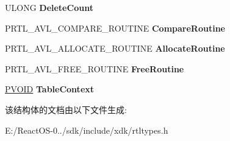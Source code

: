 \begin{DoxyCompactItemize}
U\+L\+O\+NG {\bfseries Delete\+Count}
\item 
\mbox{\label{struct___r_t_l___a_v_l___t_a_b_l_e_a6861733c4b10478e5ad30c568e4ab5cd}} 
P\+R\+T\+L\+\_\+\+A\+V\+L\+\_\+\+C\+O\+M\+P\+A\+R\+E\+\_\+\+R\+O\+U\+T\+I\+NE {\bfseries Compare\+Routine}
\item 
\mbox{\label{struct___r_t_l___a_v_l___t_a_b_l_e_a2acd7c68be0790cc70b62327ec9a2eac}} 
P\+R\+T\+L\+\_\+\+A\+V\+L\+\_\+\+A\+L\+L\+O\+C\+A\+T\+E\+\_\+\+R\+O\+U\+T\+I\+NE {\bfseries Allocate\+Routine}
\item 
\mbox{\label{struct___r_t_l___a_v_l___t_a_b_l_e_a9a3e1e9a6b17a363841ad2cc8859f6bd}} 
P\+R\+T\+L\+\_\+\+A\+V\+L\+\_\+\+F\+R\+E\+E\+\_\+\+R\+O\+U\+T\+I\+NE {\bfseries Free\+Routine}
\item 
\mbox{\label{struct___r_t_l___a_v_l___t_a_b_l_e_ab7eff19c435888386ee1141cc1c76c41}} 
\hyperlink{interfacevoid}{P\+V\+O\+ID} {\bfseries Table\+Context}
\end{DoxyCompactItemize}


该结构体的文档由以下文件生成\+:\begin{DoxyCompactItemize}
\item 
E\+:/\+React\+O\+S-\/0../sdk/include/xdk/rtltypes.\+h\end{DoxyCompactItemize}
